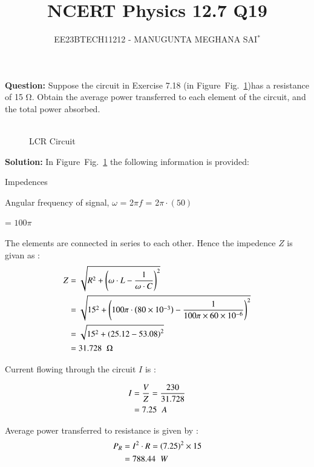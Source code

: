 \documentclass[journal,12pt,twocolumn]{IEEEtran}
\title{
	
\title{NCERT Physics 12.7 Q19}
\author{EE23BTECH11212 - MANUGUNTA MEGHANA SAI$^{*}$%
}


}
\newcommand\figref{Fig.~\ref}
\providecommand{\brak}[1]{\ensuremath{\left(#1\right)}}
\theoremstyle{remark}
\begin{document}
\maketitle

\textbf{Question:} 
Suppose the circuit in Exercise 7.18 (in Figure~\figref{fig:2})has a resistance of 15 Ω. Obtain the average power transferred to each element of the circuit, and the total power absorbed.\\
\\

\begin{figure}[h]
	\centering
	
	\caption{LCR Circuit}
	\label{fig:2}
\end{figure}
     
\textbf{Solution: }
In Figure~\figref{fig:2} the following information is provided:
 
 

 \begin{table}[h]
 	\centering
 	\resizebox{6 cm}{!}{
 		
 	}
 	\vspace{6 pt}
 	\caption{Impedences}
 	\label{tab:my_label} 
 \end{table}
 

Angular frequency of signal, $\omega$ = 2$\pi$$f$ = 2$\pi \cdot \left(50\right)$ 

= $100\pi$
 
 
 
 The elements are connected in series to each other. Hence the impedence $Z$ is givan as :
 \
 \begin{align}
 Z &= \sqrt{R^2 + \left(\omega\cdot L - \frac{1}{\omega\cdot C}\right)^2}
 \\&= \sqrt{15^2 + \left(100\pi\cdot\brak{80 \times 10^{-3}} - \frac{1}{100\pi \times 60 \times 10^{-6}}\right)^2}
 \\&= \sqrt{15^2 + \left(25.12 - 53.08\right)^2}
 \\&=31.728\hspace{0.2cm}\ohm
\end{align}	



Current flowing through the circuit $I$ is :

\begin{align}
	I&=\frac{V}{Z}=\frac{230}{31.728}
	\\&=7.25\hspace{0.2cm}A
\end{align}

Average power transferred to resistance is given by :
\begin{align}
	P_R &= I^2\cdot R = \brak{7.25}^2 \times 15
	\\&=788.44\hspace{0.2cm}W
\end{align}
\end{document}
